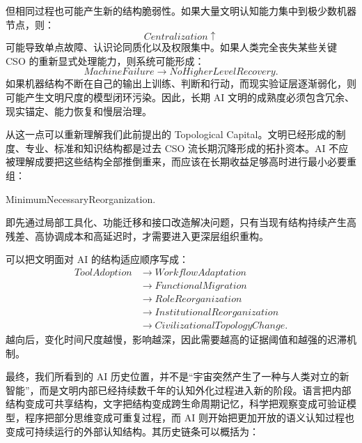 但相同过程也可能产生新的结构脆弱性。如果大量文明认知能力集中到极少数机器节点，则：
\begin{equation}
Centralization
\uparrow
\end{equation}
可能导致单点故障、认识论同质化以及权限集中。如果人类完全丧失某些关键 CSO 的重新显式处理能力，则系统可能形成：
\begin{equation}
MachineFailure
\rightarrow
NoHigherLevelRecovery.
\end{equation}
如果机器结构不断在自己的输出上训练、判断和行动，而现实验证层逐渐弱化，则可能产生文明尺度的模型闭环污染。因此，长期 AI 文明的成熟度必须包含冗余、现实锚定、能力恢复和慢层治理。

从这一点可以重新理解我们此前提出的 Topological Capital。文明已经形成的制度、专业、标准和知识结构都是过去 CSO 流长期沉降形成的拓扑资本。AI 不应被理解成要把这些结构全部推倒重来，而应该在长期收益足够高时进行最小必要重组：
\begin{statementbox}
MinimumNecessaryReorganization.
\end{statementbox}
即先通过局部工具化、功能迁移和接口改造解决问题，只有当现有结构持续产生高残差、高协调成本和高延迟时，才需要进入更深层组织重构。

可以把文明面对 AI 的结构适应顺序写成：
\begin{equation}
\begin{aligned}
ToolAdoption
&\rightarrow
WorkflowAdaptation
\\
&\rightarrow
FunctionalMigration
\\
&\rightarrow
RoleReorganization
\\
&\rightarrow
InstitutionalReorganization
\\
&\rightarrow
CivilizationalTopologyChange.
\end{aligned}
\end{equation}
越向后，变化时间尺度越慢，影响越深，因此需要越高的证据阈值和越强的迟滞机制。

最终，我们所看到的 AI 历史位置，并不是“宇宙突然产生了一种与人类对立的新智能”，而是文明内部已经持续数千年的认知外化过程进入新的阶段。语言把内部结构变成可共享结构，文字把结构变成跨生命周期记忆，科学把观察变成可验证模型，程序把部分思维变成可重复过程，而 AI 则开始把更加开放的语义认知过程也变成可持续运行的外部认知结构。其历史链条可以概括为：
\begin{statementbox}
\centering
{}
\end{statementbox}


